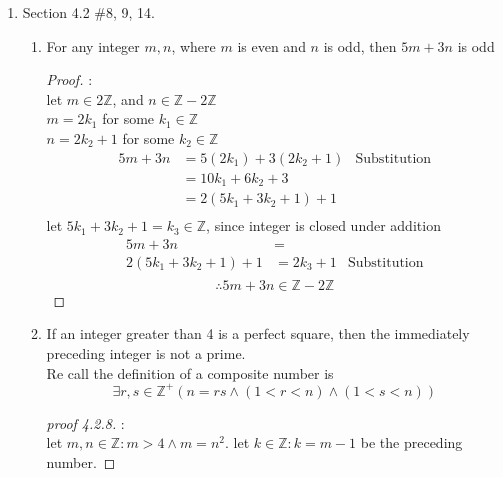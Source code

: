 \documentclass[12pt]{article}
\newcommand{\Z}{\mathbb{Z}}
\newcommand{\paren}[1]{\left( #1 \right)}
\newcommand{\defcomp}{\exists r,s\in \Z^+ \paren{n=rs \wedge \paren{1<r<n} \wedge \paren{1<s<n}}}
\begin{document}
\begin{enumerate}
        \newpage
        \item Section 4.2 \#8, 9, 14.     
            \begin{enumerate}
                \item[8.] For any integer $m,n$, where $m$ is even and $n$ is odd, then $5m+3n$ is odd
                \begin{proof}:\\
                    let $m \in 2\Z$, and $n  \in \Z - 2\Z$\\
                    $m = 2k_1$ for some $k_1 \in \Z$\\
                    $n = 2k_2 + 1$ for some $k_2 \in \Z$
                    \begin{align*}
                        5m+3n &= 5\paren{2k_1} + 3\paren{2k_2 + 1} & \text{Substitution}\\
                        &= 10k_1 + 6k_2 +3\\
                        &= 2\paren{5k_1 + 3k_2 + 1} + 1\\
                    \end{align*}
                    let $5k_1 + 3k_2 + 1 = k_3 \in \Z$, since integer is closed under addition
                    \begin{align*}
                        5m+3n &= \\
                        2\paren{5k_1 + 3k_2 + 1} + 1 &= 2k_3 + 1 &\text{Substitution}\\
                    \end{align*}
                    \[
                    \therefore 5m+3n \in \Z - 2\Z
                    \]
                    
                \end{proof}
                
                \item[9.] If an integer greater than 4 is a perfect square, then the immediately preceding integer is not a prime.\\
                Re call the definition of a composite number is
                \[
                \defcomp
                \]
                    \begin{proof}[proof 4.2.8]:\\
                        let $m,n \in \Z:m>4 \wedge m = n^2$. let $k\in \Z: k = m-1$ be the preceding number.
 

\end{proof}
\end{enumerate}
\end{enumerate}
\end{document}
